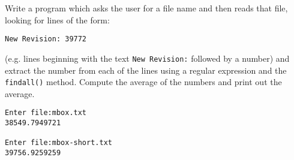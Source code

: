 \begin{ex}
Write a program which asks the user for a file name and then reads that file, looking for lines of the form:

\verb"New Revision: 39772"

(e.g. lines beginning with the text {\tt New Revision:} followed by a number) and extract the number from each of the lines using a regular expression
and the {\tt findall()} method.  Compute the average of the numbers and 
print out the average.

\beforeverb
\begin{verbatim}
Enter file:mbox.txt 
38549.7949721

Enter file:mbox-short.txt
39756.9259259
\end{verbatim}
\afterverb
%

\end{ex}

